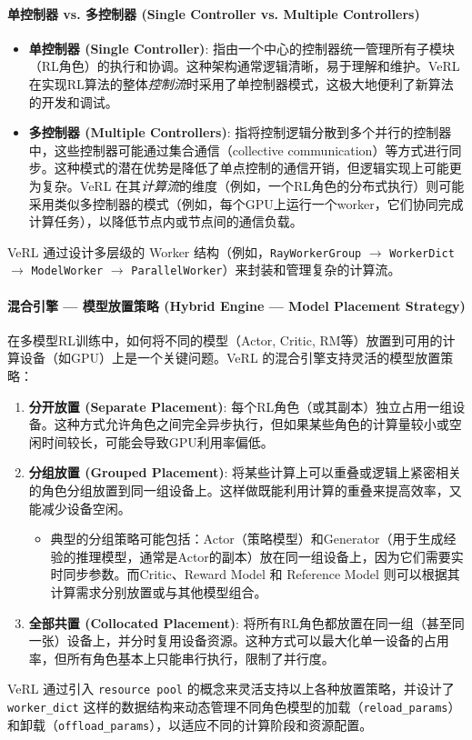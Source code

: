 \documentclass{pkuthesis}
\begin{document}
\paragraph{单控制器 vs. 多控制器 (Single Controller vs. Multiple Controllers)}
\begin{itemize}
    \item \textbf{单控制器 (Single Controller)}: 指由一个中心的控制器统一管理所有子模块（RL角色）的执行和协调。这种架构通常逻辑清晰，易于理解和维护。VeRL 在实现RL算法的整体\emph{控制流}时采用了单控制器模式，这极大地便利了新算法的开发和调试。
    \item \textbf{多控制器 (Multiple Controllers)}: 指将控制逻辑分散到多个并行的控制器中，这些控制器可能通过集合通信（collective communication）等方式进行同步。这种模式的潜在优势是降低了单点控制的通信开销，但逻辑实现上可能更为复杂。VeRL 在其\emph{计算流}的维度（例如，一个RL角色的分布式执行）则可能采用类似多控制器的模式（例如，每个GPU上运行一个worker，它们协同完成计算任务），以降低节点内或节点间的通信负载。
\end{itemize}
VeRL 通过设计多层级的 Worker 结构（例如，\texttt{RayWorkerGroup} $\rightarrow$ \texttt{WorkerDict} $\rightarrow$ \texttt{ModelWorker} $\rightarrow$ \texttt{ParallelWorker}）来封装和管理复杂的计算流。

\paragraph{混合引擎 — 模型放置策略 (Hybrid Engine — Model Placement Strategy)}
在多模型RL训练中，如何将不同的模型（Actor, Critic, RM等）放置到可用的计算设备（如GPU）上是一个关键问题。VeRL 的混合引擎支持灵活的模型放置策略：
\begin{enumerate}
    \item \textbf{分开放置 (Separate Placement)}: 每个RL角色（或其副本）独立占用一组设备。这种方式允许角色之间完全异步执行，但如果某些角色的计算量较小或空闲时间较长，可能会导致GPU利用率偏低。
    \item \textbf{分组放置 (Grouped Placement)}: 将某些计算上可以重叠或逻辑上紧密相关的角色分组放置到同一组设备上。这样做既能利用计算的重叠来提高效率，又能减少设备空闲。
    \begin{itemize}
        \item 典型的分组策略可能包括：Actor（策略模型）和Generator（用于生成经验的推理模型，通常是Actor的副本）放在同一组设备上，因为它们需要实时同步参数。而Critic、Reward Model 和 Reference Model 则可以根据其计算需求分别放置或与其他模型组合。
    \end{itemize}
    \item \textbf{全部共置 (Collocated Placement)}: 将所有RL角色都放置在同一组（甚至同一张）设备上，并分时复用设备资源。这种方式可以最大化单一设备的占用率，但所有角色基本上只能串行执行，限制了并行度。
\end{enumerate}
VeRL 通过引入 \texttt{resource pool} 的概念来灵活支持以上各种放置策略，并设计了 \texttt{worker\_dict} 这样的数据结构来动态管理不同角色模型的加载（\texttt{reload\_params}）和卸载（\texttt{offload\_params}），以适应不同的计算阶段和资源配置。
\end{document}
